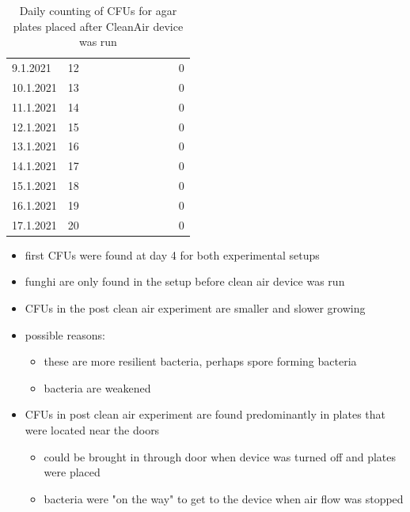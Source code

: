 \documentclass[hyperref]{labbook}
\begin{document}
\begin{table}[H]
\begin{tabular}{|l r | rrrrrrrrr|}
9.1.2021  &12 &            &             &           &            &    &     &      &       &0  \\
10.1.2021 &13 &            &             &           &            &    &     &      &       &0  \\
11.1.2021 &14 &            &             &           &            &    &     &      &       &0  \\
12.1.2021 &15 &            &             &           &            &    &     &      &       &0  \\
13.1.2021 &16 &            &             &           &            &    &     &      &       &0  \\
14.1.2021 &17 &            &             &           &            &    &     &      &       &0  \\
15.1.2021 &18 &            &             &           &            &    &     &      &       &0  \\
16.1.2021 &19 &            &             &           &            &    &     &      &       &0  \\
17.1.2021 &20 &            &             &           &            &    &     &      &       &0  \\\hline
\end{tabular}
\caption{Daily counting of CFUs for agar plates placed after CleanAir device was run}
\end{table}
\begin{itemize}
\item first CFUs were found at day 4 for both experimental setups
\item funghi are only found in the setup before clean air device was run
\item CFUs in the post clean air experiment are smaller and slower growing
\item possible reasons:
\begin{itemize}
\item these are more resilient bacteria, perhaps spore forming bacteria
\item bacteria are weakened
\end{itemize}
\item CFUs in post clean air experiment are found predominantly in plates that were located near the doors
\begin{itemize}
\item could be brought in through door when device was turned off and plates were placed
\item bacteria were "on the way" to get to the device when air flow was stopped
\end{itemize}
\end{itemize}
\end{document}
